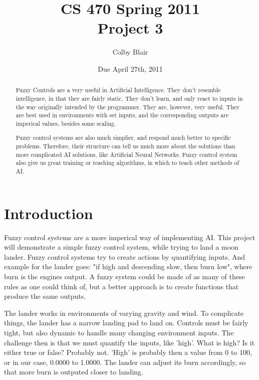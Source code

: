 \documentclass[12pt]{article}
\title{CS 470 Spring 2011 \\
     Project 3}
\author{Colby Blair}
\date{Due April 27th, 2011}
\begin{document}
\maketitle

\begin{abstract}
Fuzzy Controls are a very useful in Artificial Intelligence. They don't resemble intelligence, in that they are
fairly static. They don't learn, and only react to inputs in the way originally intended by the programmer.
They are, however, very useful. They are best used in environments with set inputs, and the corresponding
outputs are imperical values, besides some scaling. 

Fuzzy control systems are also much simplier, and respond much better to specific problems. Therefore, 
their structure can tell us much more about the solutions than more complicated AI solutions, like Artificial
Neural Networks. Fuzzy control system also give us great training or teaching algorithms, in which to teach
other methods of AI.
\end{abstract}

\thispagestyle{empty}

\pagebreak

\thispagestyle{empty}
\tableofcontents
\listoffigures

\pagebreak

\setcounter{page}{1}

\section{Introduction}
Fuzzy control systems are a more imperical way of implementing AI. This project will demonstrate a simple 
fuzzy control system, while trying to land a moon lander. Fuzzy control systems try to create actions by
quantifying inputs. And example for the lander goes: "if high and descending slow, then burn low", where 
burn is the engines output. A fuzzy system could be made of as many of these rules as one could think of,
but a better approach is to create functions that produce the same outputs.

The lander works in environments of varying gravity and wind. To complicate things, the lander has a narrow 
landing pad to land on. Controls must be fairly tight, but also dynamic to handle many changing environment 
inputs. The challenge then is that we must quantify the inputs, like 'high'. What is high? Is it either true or 
false? Probably not. 'High' is probably then a value from 0 to 100, or in our case, 0.0000 to 1.0000. The lander 
can adjust its burn accordingly, so that more burn is outputed closer to landing. 
\end{document}
